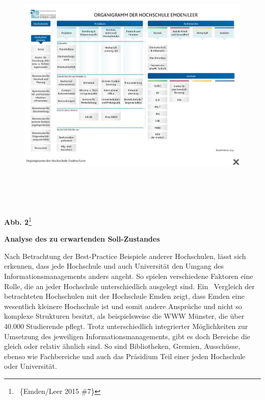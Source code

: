 \documentclass[a4paper]{article}
\newcommand\textstyleAbsatzStandardschriftart[1]{#1}
\begin{document}
\begin{figure}
\centering
\includegraphics[width=17.731cm,height=12.446cm]{VorlaufigeSollSituationeblingsprafkeluebke-img/VorlaufigeSollSituationeblingsprafkeluebke-img006.jpg}
\end{figure}

\bigskip


\bigskip


\bigskip


\bigskip


\bigskip

\newline
\textstyleAbsatzStandardschriftart{\textsf{\textbf{Abb. 2}}}\footnote{\ \{Emden/Leer 2015 \#7\}}


\bigskip

\clearpage
\bigskip

{\sffamily\bfseries
Analyse des zu erwartenden Soll-Zustandes}


\bigskip

{\sffamily
Nach Betrachtung der Best-Practice Beispiele anderer Hochschulen, lässt sich erkennen, dass jede Hochschule und auch
Universität den Umgang des Informationsmanagements anders angeht. So spielen verschiedene Faktoren eine Rolle, die an
jeder Hochschule unterschiedlich ausgelegt sind. Ein \ Vergleich der betrachteten Hochschulen mit der Hochschule Emden
zeigt, dass Emden eine wesentlich kleinere Hochschule ist und somit andere Ansprüche und nicht so komplexe Strukturen
besitzt, als beispielsweise die WWW Münster, die über 40.000 Studierende pflegt. Trotz unterschiedlich integrierter
Möglichkeiten zur Umsetzung des jeweiligen Informationsmanagements, gibt es doch Bereiche die gleich oder relativ
ähnlich sind. So sind Bibliotheken, Gremien, Ausschüsse, ebenso wie Fachbereiche und auch das Präsidium Teil einer
jeden Hochschule oder Universität. }
\end{document}
